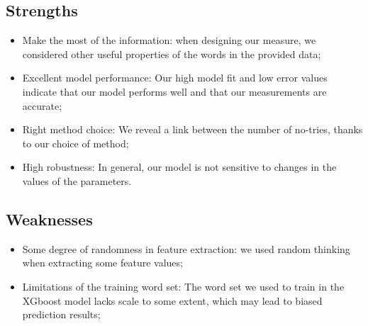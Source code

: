 \documentclass[12pt]{article}  %
\begin{document}
\subsection{Strengths}

\begin{itemize}
    \item Make the most of the information: when designing our measure, we considered other useful properties of the words in the provided data;
    \item Excellent model performance: Our high model fit and low error values indicate that our model performs well and that our measurements are accurate;
    \item Right method choice: We reveal a link between the number of no-tries, thanks to our choice of method;
    \item High robustness: In general, our model is not sensitive to changes in the values of the parameters.
\end{itemize}

\subsection{Weaknesses}
\begin{itemize}
    \item Some degree of randomness in feature extraction: we used random thinking when extracting some feature values;
    \item Limitations of the training word set: The word set we used to train in the XGboost model lacks scale to some extent, which may lead to biased prediction results;
 \end{itemize}
\end{document}
